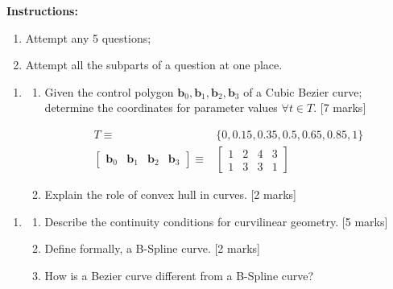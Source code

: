 \documentclass[11pt,a4paper,onecolumn]{tiet-question-paper}
\date{28 May 2024}
\begin{document}
\maketitle
\textbf{Instructions:}
\begin{enumerate}
\item Attempt any 5 questions;
\item Attempt all the subparts of a question at one
  place.
\end{enumerate}
\bvrhrule[0.4pt]
\begin{enumerate}
\item
  \begin{enumerate}
  \item Given the control polygon
    $\textbf{b}_0, \textbf{b}_1, \textbf{b}_2,
    \textbf{b}_3$ of a Cubic Bezier curve; determine
    the coordinates for parameter values
    $\forall t\in T$. \hfill [7 marks]

    \begin{align*}
      T \equiv
      & \{0, 0.15, 0.35, 0.5, 0.65, 0.85, 1\} \\
      \begin{bmatrix}
        \textbf{b}_0 &\textbf{b}_1& \textbf{b}_2& \textbf{b}_3
      \end{bmatrix} \equiv
      & \begin{bmatrix}
        1&2&4&3\\ 1&3&3&1
      \end{bmatrix}
    \end{align*}
  \item Explain the role of convex hull in curves.
    \hfill[2 marks]
  \end{enumerate}
\end{enumerate}
\bvrhrule[0.4pt]
\begin{enumerate}[resume]
\item
  \begin{enumerate}
  \item Describe the continuity conditions for
    curvilinear geometry.
    \hfill[5 marks]
  \item Define formally, a B-Spline curve. \hfill [2
    marks]
  \item How is a Bezier curve different from a B-Spline
    curve?
  \end{enumerate}
\end{enumerate}
\bvrhrule[0.4pt]
\end{document}
